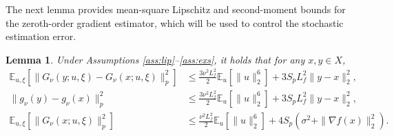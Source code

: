 \documentclass[11pt]{article}
\newtheorem{lemma}{Lemma}[section]
\numberwithin{equation}{section}
\newcommand{\E}{\mathbb{E}}
\begin{document}
The next lemma provides mean-square Lipschitz and second-moment bounds for the zeroth-order gradient estimator, which will be used to control the stochastic estimation error.  
\begin{lemma}\label{le:lip}
    Under Assumptions \ref{ass:lip}--\ref{ass:exs}, it holds that for any $x,y \in X$,
    \begin{equation*}     \begin{aligned}
       \E_{u,\xi} [\|G_\nu(y;u,\xi)-G_\nu(x;u,\xi)\|_p^2] & \leq \frac{3\nu^2L_f^2}{2}\E_u [\|u\|_2^6] + 3 S_p L_f^2 \|y-x\|_2^2,\\
         \| g_\nu (y) - g_\nu (x) \|_p^2 & \leq \frac{3\nu^2L_f^2}{2}\E_u [\|u\|_2^6] + 3 S_p L_f^2 \|y-x\|_2^2,\\
        \E_{u,\xi} [\|G_\nu(x;u,\xi)\|_p^2] & \leq \frac{\nu^2L_f^2}{2}\E_u [\|u\|_2^6] + 4 S_p (\sigma^2 + \|\nabla f(x)\|_2^2).
    \end{aligned}
    \end{equation*}
\end{lemma}
\end{document}
